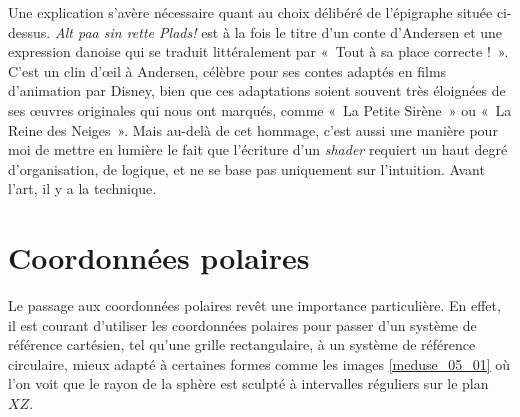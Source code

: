 Une explication s'avère nécessaire quant au choix délibéré de l'épigraphe située ci-dessus. \textit{Alt paa sin rette Plads!} est à la fois le titre d'un conte d'Andersen et une expression danoise qui se traduit littéralement par «~Tout à sa place correcte !~». C'est un clin d'œil à Andersen, célèbre pour ses contes adaptés en films d'animation par Disney, bien que ces adaptations soient souvent très éloignées de ses œuvres originales qui nous ont marqués, comme «~La Petite Sirène~» ou «~La Reine des Neiges~». Mais au-delà de cet hommage, c'est aussi une manière pour moi de mettre en lumière le fait que l'écriture d'un \textit{shader} requiert un haut degré d'organisation, de logique, et ne se base pas uniquement sur l'intuition. Avant l'art, il y a la technique.

\section{Coordonnées polaires}
Le passage aux coordonnées polaires revêt une importance particulière. En effet, il est courant d'utiliser les coordonnées polaires pour passer d'un système de référence cartésien, tel qu'une grille rectangulaire, à un système de référence circulaire, mieux adapté à certaines formes comme les images \ref{meduse_05_01} où l'on voit que le rayon de la sphère est sculpté à intervalles réguliers sur le plan $XZ$.

